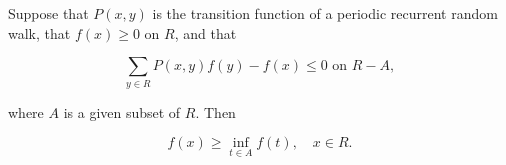 Suppose that $P(x,y)$ is the transition function of a periodic recurrent random walk, that $f(x) \geq 0$ on $R$, and that

$$\sum_{y \in R} P(x,y)f(y) - f(x) \leq 0 \text{ on } R - A,$$

where $A$ is a given subset of $R$. Then

$$f(x) \geq \inf_{t \in A} f(t), \quad x \in R.$$